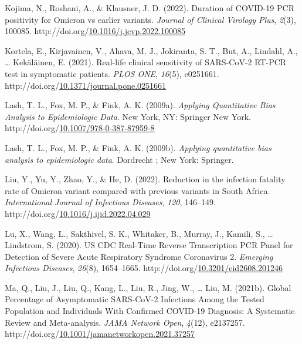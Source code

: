 \documentclass[12pt,twoside]{smiththesis}
\newlength{\cslhangindent}
\newenvironment{CSLReferences}[2] %
 {%
\setlength{\parindent}{0pt}
\ifodd #1 \everypar{\setlength{\hangindent}{\cslhangindent}}\ignorespaces\fi
\ifnum #2 > 0
\setlength{\parskip}{#2\baselineskip}
  \fi
}%
{}
\begin{document}
\begin{CSLReferences}{1}{0}
\leavevmode{}%
Kojima, N., Roshani, A., \& Klausner, J. D. (2022). Duration of {COVID-19 PCR} positivity for {Omicron} vs earlier variants. \emph{Journal of Clinical Virology Plus}, \emph{2}(3), 100085. http://doi.org/\href{https://doi.org/10.1016/j.jcvp.2022.100085}{10.1016/j.jcvp.2022.100085}

\leavevmode{}%
Kortela, E., Kirjavainen, V., Ahava, M. J., Jokiranta, S. T., But, A., Lindahl, A., \ldots{} Kekäläinen, E. (2021). Real-life clinical sensitivity of {SARS-CoV-2 RT-PCR} test in symptomatic patients. \emph{PLOS ONE}, \emph{16}(5), e0251661. http://doi.org/\href{https://doi.org/10.1371/journal.pone.0251661}{10.1371/journal.pone.0251661}

\leavevmode{}%
Lash, T. L., Fox, M. P., \& Fink, A. K. (2009a). \emph{Applying {Quantitative Bias Analysis} to {Epidemiologic Data}}. {New York, NY}: {Springer New York}. http://doi.org/\href{https://doi.org/10.1007/978-0-387-87959-8}{10.1007/978-0-387-87959-8}

\leavevmode{}%
Lash, T. L., Fox, M. P., \& Fink, A. K. (2009b). \emph{Applying quantitative bias analysis to epidemiologic data}. {Dordrecht ; New York}: {Springer}.

\leavevmode{}%
Liu, Y., Yu, Y., Zhao, Y., \& He, D. (2022). Reduction in the infection fatality rate of {Omicron} variant compared with previous variants in {South Africa}. \emph{International Journal of Infectious Diseases}, \emph{120}, 146--149. http://doi.org/\href{https://doi.org/10.1016/j.ijid.2022.04.029}{10.1016/j.ijid.2022.04.029}

\leavevmode{}%
Lu, X., Wang, L., Sakthivel, S. K., Whitaker, B., Murray, J., Kamili, S., \ldots{} Lindstrom, S. (2020). {US CDC Real-Time Reverse Transcription PCR Panel} for {Detection} of {Severe Acute Respiratory Syndrome Coronavirus} 2. \emph{Emerging Infectious Diseases}, \emph{26}(8), 1654--1665. http://doi.org/\href{https://doi.org/10.3201/eid2608.201246}{10.3201/eid2608.201246}

\leavevmode{}%
Ma, Q., Liu, J., Liu, Q., Kang, L., Liu, R., Jing, W., \ldots{} Liu, M. (2021b). Global {Percentage} of {Asymptomatic SARS-CoV-2 Infections Among} the {Tested Population} and {Individuals With Confirmed COVID-19 Diagnosis}: {A Systematic Review} and {Meta-analysis}. \emph{JAMA Network Open}, \emph{4}(12), e2137257. http://doi.org/\href{https://doi.org/10.1001/jamanetworkopen.2021.37257}{10.1001/jamanetworkopen.2021.37257}


\end{CSLReferences}
\end{document}

